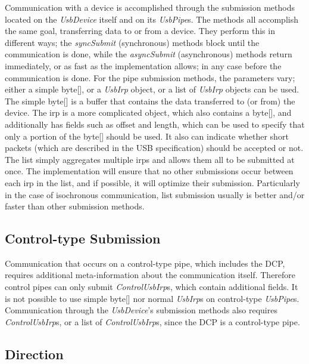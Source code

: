 \documentclass{article}
\newcommand{\myinterface}[1]{\emph{#1}}
\newcommand{\mymethod}[1]{\emph{#1}}
\begin{document}
Communication with a device is accomplished through the submission methods
located on the \myinterface{UsbDevice} itself and on its \myinterface{UsbPipe}s.
The methods all accomplish the same goal, transferring data to or from a device.
They perform this in different ways; the \mymethod{syncSubmit} (synchronous)
methods block until the communication is done, while the \mymethod{asyncSubmit}
(asynchronous) methods return immediately, or as fast as the implementation allows;
in any case before the communication is done.  For the pipe submission methods,
the parameters vary; either a simple byte[], or a \myinterface{UsbIrp} object,
or a list of \myinterface{UsbIrp} objects can be used.  The simple byte[]
is a buffer that contains the data transferred to (or from) the device.
The irp is a more complicated object, which also contains a byte[], and
additionally has fields such as offset and length, which can be used
to specify that only a portion of the byte[] should be used.  It also
can indicate whether short packets (which are described in the USB specification)
should be accepted or not.  The list simply aggregates multiple irps and
allows them all to be submitted at once.  The implementation will ensure
that no other submissions occur between each irp in the list, and if possible,
it will optimize their submission.  Particularly in the case of isochronous
communication, list submission usually is better and/or faster than
other submission methods.

\subsection{Control-type Submission}

Communication that occurs on a control-type pipe, which includes the
DCP, requires additional meta-information about the
communication itself.  Therefore control pipes can only submit
\myinterface{ControlUsbIrp}s, which contain additional fields.
It is not possible to use simple byte[] nor normal \myinterface{UsbIrp}s
on control-type \myinterface{UsbPipe}s.  Communication through
the \myinterface{UsbDevice}'s submission methods also requires
\myinterface{ControlUsbIrp}s, or a list of \myinterface{ControlUsbIrp}s,
since the DCP is a control-type pipe.

\subsection{Direction}
\end{document}
